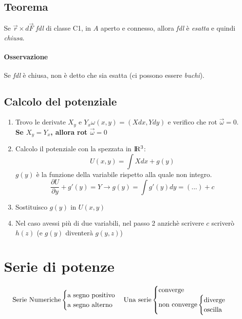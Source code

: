 \documentclass[10pt,a4paper,fleqn]{article}
\begin{document}
	\subsection{Teorema}

	Se $\vec r \times d\vec F$ \emph{fdl} di classe C1, in $A$ aperto e connesso, allora \emph{fdl} è \emph{esatta} e quindi \emph{chiusa}.
	\paragraph{Osservazione} Se \emph{fdl} è chiusa, non è detto che sia esatta (ci possono essere \emph{buchi}).

	\subsection{Calcolo del potenziale}

	\begin{enumerate}
	\item Trovo le derivate $X_y$ e $Y_x$\quad $\omega(x,y)=(Xdx, Ydy)$ e verifico che rot $\vec\omega=0$.\\
	\textbf{Se $X_y = Y_x$, allora rot $ \vec\omega = 0$}

	\item Calcolo il potenziale con la spezzata in $\rm I\!R^3$:
		\begin{equation}
		U(x,y)=\int Xdx + g(y)
		\end{equation}
		$g(y)$ è la funzione della variabile rispetto alla quale non integro.
		\begin{equation}
		\frac{\partial U}{\partial y} + g'(y) = Y \longrightarrow g(y)=\int g'(y)dy = (...)+c
		\end{equation}
		\item Sostituisco $g(y)$ in $U(x,y)$
		\item Nel caso avessi più di due variabili, nel passo 2 anzichè scrivere $c$ scriverò $h(z)$ (e $g(y)$ diventerà $g(y,z)$)
	\end{enumerate}
	
	\section{Serie di potenze}
	\begin{equation}
		\text{Serie Numeriche}
			\begin{cases}
				\text{a segno positivo}\\
				\text{a segno alterno}
			\end{cases}\\
		\text{Una serie}
			\begin{cases}
				\text{converge}\\
				\text{non converge}\begin{cases}
					\text{diverge}\\
					\text{oscilla}
				\end{cases}
			\end{cases}
	\end{equation}
\end{document}
